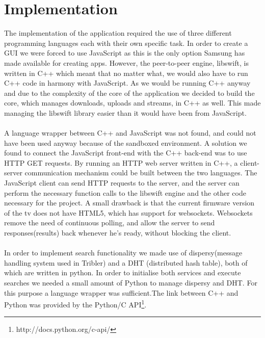 \chapter{Implementation}

The implementation of the application required the use of three different programming languages each with their own specific task. In order to create a GUI we were forced to use JavaScript as this is the only option Samsung has made available for creating apps. However, the peer-to-peer engine, libswift, is written in C++ which meant that no matter what, we would also have to run C++ code in harmony with JavaScript. As we would be running C++ anyway and due to the complexity of the core of the application we decided to build the core, which manages downloads, uploads and streams, in C++ as well. This made managing the libswift library easier than it would have been from JavaScript.
\\\\
A language wrapper between C++ and JavaScript was not found, and could not have been used anyway because of the sandboxed environment. A solution we found to connect the JavaScript front-end with the C++ back-end was to use HTTP GET requests. By running an HTTP web server written in C++, a client-server communication mechanism could be built between the two languages. The JavaScript client can send HTTP requests to the server, and the server can perform the necessary function calls to the libswift engine and the other code necessary for the project. A small drawback is that the current firmware version of the tv does not have HTML5, which has support for websockets. Websockets remove the need of continuous polling, and allow the server to send responses(results) back whenever he's ready, without blocking the client. 
\\\\
In order to implement search functionality we made use of dispersy(message handling system used in Tribler) and a DHT (distributed hash table), both of which are written in python. In order to initialise both services and execute searches we needed a small amount of Python to manage dispersy and DHT. For this purpose a language wrapper was sufficient.The link between C++ and Python was provided by the Python/C API\footnote{http://docs.python.org/c-api/}.

